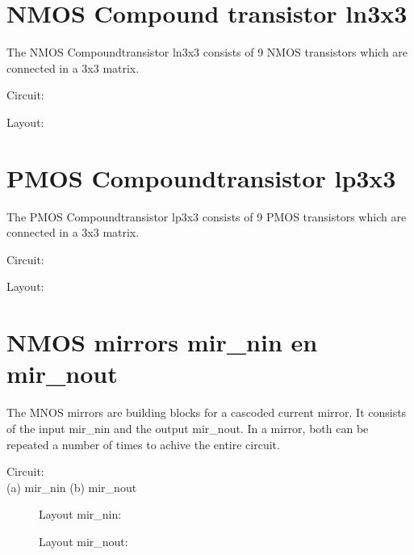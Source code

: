\section {NMOS Compound transistor ln3x3}

The NMOS Compoundtransistor ln3x3 consists of 9 NMOS transistors
which are connected in a 3x3 matrix.

Circuit:
\begin{figure}[h]
\centerline{}
\end{figure}

Layout:
\begin{figure}[h]
\centerline{}
\end{figure}

\clearpage

\section {PMOS Compoundtransistor lp3x3}
The PMOS Compoundtransistor lp3x3 consists of 9 PMOS transistors
which are connected in a 3x3 matrix.

Circuit:
\begin{figure}[h]
\centerline{}
\end{figure}

Layout:
\begin{figure}[h]
\centerline{}
\end{figure}

\clearpage

\section {NMOS mirrors mir\_nin en mir\_nout}

The MNOS mirrors are building blocks for a cascoded current mirror.
It consists of the input mir\_nin and the output mir\_nout.
In a mirror, both can be repeated a number of times to achive the
entire circuit.

Circuit:\\
(a) mir\_nin (b) mir\_nout
\vspace{1cm}
\begin{figure}[h]
\centerline{}
\end{figure}
\newpage
\begin{figure}[h]
Layout mir\_nin:\\

\centerline{}
\vspace{1cm}
Layout mir\_nout:\\

\centerline{}
\end{figure}
\clearpage

